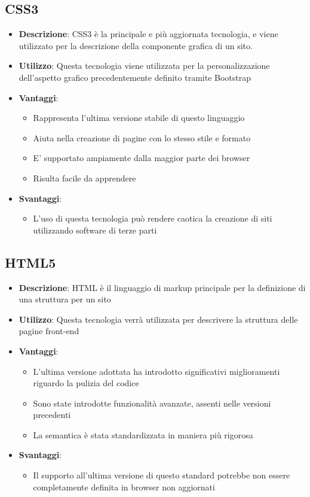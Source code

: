 \subsection{CSS3}
\begin{itemize}
	\item \textbf{Descrizione}: CSS3 è la principale e più aggiornata tecnologia, e viene utilizzato per la descrizione della componente grafica di un sito.
	\item \textbf{Utilizzo}: Questa tecnologia viene utilizzata per la personalizzazione dell'aspetto grafico precedentemente definito tramite Bootstrap
	\item \textbf{Vantaggi}:
	\begin{itemize}
		\item Rappresenta l'ultima versione stabile di questo linguaggio
		\item Aiuta nella creazione di pagine con lo stesso stile e formato
		\item E' supportato ampiamente dalla maggior parte dei browser
		\item Risulta facile da apprendere
	\end{itemize}
	\item \textbf{Svantaggi}:
	\begin{itemize}
		\item L'uso di questa tecnologia può rendere caotica la creazione di siti utilizzando software di terze parti
	\end{itemize}
\end{itemize}

\subsection{HTML5}
\begin{itemize}
	\item \textbf{Descrizione}: HTML è il linguaggio di markup principale per la definizione di una struttura per un sito
	\item \textbf{Utilizzo}: Questa tecnologia verrà utilizzata per descrivere la struttura delle pagine front-end
	\item \textbf{Vantaggi}:
	\begin{itemize}
		\item L'ultima versione adottata ha introdotto significativi miglioramenti riguardo la pulizia del codice
		\item Sono state introdotte funzionalità avanzate, assenti nelle versioni precedenti
		\item La semantica è stata standardizzata in maniera più rigorosa
	\end{itemize}
	\item \textbf{Svantaggi}:
	\begin{itemize}
		\item Il supporto all'ultima versione di questo standard potrebbe non essere completamente definita in browser non aggiornati
	\end{itemize}
\end{itemize}

